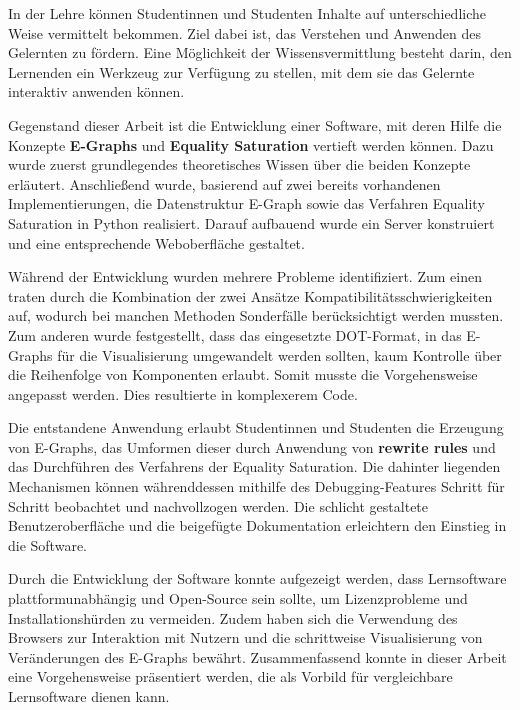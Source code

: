 In der Lehre können Studentinnen und Studenten Inhalte auf unterschiedliche Weise vermittelt bekommen. Ziel dabei ist, das Verstehen und Anwenden des Gelernten zu fördern.
Eine Möglichkeit der Wissensvermittlung besteht darin, den Lernenden ein Werkzeug zur Verfügung zu stellen, mit dem sie das Gelernte interaktiv anwenden können.

Gegenstand dieser Arbeit ist die Entwicklung einer Software, mit deren Hilfe die Konzepte \textbf{E-Graphs} und \textbf{Equality Saturation} vertieft werden können.
Dazu wurde zuerst grundlegendes theoretisches Wissen über die beiden Konzepte erläutert. 
Anschließend wurde, basierend auf zwei bereits vorhandenen Implementierungen, die Datenstruktur E-Graph sowie das Verfahren Equality Saturation in Python realisiert. 
Darauf aufbauend wurde ein Server konstruiert und eine entsprechende Weboberfläche gestaltet.

Während der Entwicklung wurden mehrere Probleme identifiziert. Zum einen traten durch die Kombination der zwei Ansätze Kompatibilitätsschwierigkeiten auf, wodurch bei manchen
Methoden Sonderfälle berücksichtigt werden mussten. Zum anderen wurde festgestellt, dass das eingesetzte DOT-Format, in das E-Graphs für die Visualisierung umgewandelt werden sollten, 
kaum Kontrolle über die Reihenfolge von Komponenten erlaubt. Somit musste die Vorgehensweise angepasst werden. Dies resultierte in komplexerem Code.

Die entstandene Anwendung erlaubt Studentinnen und Studenten die Erzeugung von E-Graphs, das Umformen dieser durch Anwendung von \textbf{rewrite rules} und das Durchführen
des Verfahrens der Equality Saturation. Die dahinter liegenden Mechanismen können währenddessen mithilfe des Debugging-Features Schritt für Schritt beobachtet und nachvollzogen werden.
Die schlicht gestaltete Benutzeroberfläche und die beigefügte Dokumentation erleichtern den Einstieg in die Software. 

Durch die Entwicklung der Software konnte aufgezeigt werden, dass Lernsoftware plattformunabhängig und Open-Source sein sollte, um Lizenzprobleme und Installationshürden zu vermeiden.
Zudem haben sich die Verwendung des Browsers zur Interaktion mit Nutzern und die schrittweise Visualisierung von Veränderungen des E-Graphs bewährt. 
Zusammenfassend konnte in dieser Arbeit eine Vorgehensweise präsentiert werden, die als Vorbild für vergleichbare Lernsoftware dienen kann.
